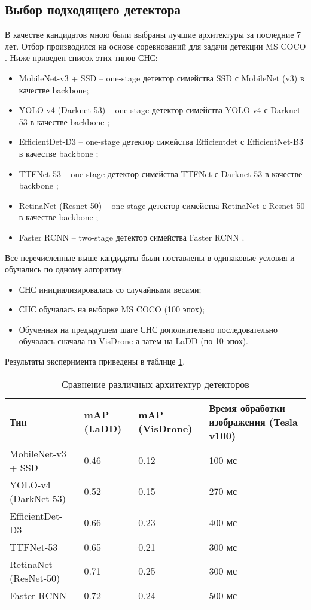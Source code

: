 \subsection{Выбор подходящего детектора}

В качестве кандидатов мною были выбраны лучшие архитектуры за последние 7 лет. Отбор производился на основе соревнований для задачи детекции MS COCO \cite{lib-coco}. Ниже приведен список этих типов СНС:
\begin{itemize}
    \item MobileNet-v3 + SSD -- one-stage детектор симейства SSD с MobileNet (v3) \cite{lib-mobilenet} в качестве backbone;
    \item YOLO-v4 (Darknet-53) -- one-stage детектор симейства YOLO v4 с Darknet-53 в качестве backbone \cite{lib-yolo};
    \item EfficientDet-D3 -- one-stage детектор симейства Efficientdet с EfficientNet-B3 в качестве backbone \cite{lib-efficientdet};
    \item TTFNet-53 -- one-stage детектор симейства TTFNet с Darknet-53 в качестве backbone \cite{lib-ttfnet};
    \item RetinaNet (Resnet-50) -- one-stage детектор симейства RetinaNet с Resnet-50 \cite{lib-resnet} в качестве backbone \cite{lib-retinanet};
    \item Faster RCNN -- two-stage детектор симейства Faster RCNN \cite{lib-rcnn}.
\end{itemize}

Все перечисленные выше кандидаты были поставлены в одинаковые условия и обучались по одному алгоритму:
\begin{itemize}
    \item СНС инициализировалась со случайными весами;
    \item СНС обучалась на выборке MS COCO (100 эпох);
    \item Обученная на предыдущем шаге СНС дополнительно последовательно обучалась сначала на VisDrone а затем на LaDD (по 10 эпох).
\end{itemize}

Результаты эксперимента приведены в таблице \ref{leaderboard-table}.

\begin{table}[H]
  \caption{Сравнение различных архитектур детекторов}\label{leaderboard-table}
  \begin{tabular}{|p{4cm}|p{3cm}|p{3cm}|p{5cm}|}
    \hline
    {Тип} & {mAP (LaDD)} & {mAP (VisDrone)} & {Время обработки изображения (Tesla v100)} \\
    \hline
    MobileNet-v3 + SSD & 0.46 & 0.12 & 100 мс \\
    \hline
    YOLO-v4 (DarkNet-53) & 0.52 & 0.15 & 270 мс \\
    \hline
    EfficientDet-D3 & 0.66 & 0.23 & 400 мс \\
    \hline
    TTFNet-53 & 0.65 & 0.21 & 300 мс \\
    \hline
    RetinaNet (ResNet-50) & 0.71 & 0.25 & 300 мс \\
    \hline 
    Faster RCNN & 0.72 & 0.24 & 500 мс \\
    \hline
  \end{tabular}
\end{table}

